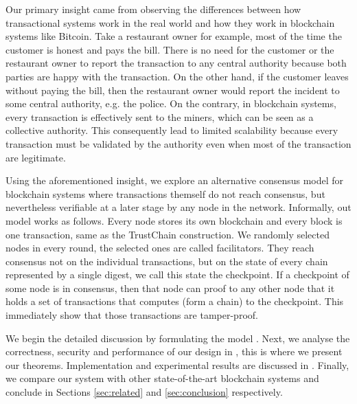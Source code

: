 Our primary insight came from observing the differences between how transactional systems work in the real world and how they work in blockchain systems like Bitcoin. 
Take a restaurant owner for example, most of the time the customer is honest and pays the bill.
There is no need for the customer or the restaurant owner to report the transaction to any central authority 
because both parties are happy with the transaction.
On the other hand, if the customer leaves without paying the bill,
then the restaurant owner would report the incident to some central authority, e.g. the police.
On the contrary, in blockchain systems, every transaction is effectively sent to the miners,
which can be seen as a collective authority.
This consequently lead to limited scalability because every transaction must be validated by the authority even when most of the transaction are legitimate.

Using the aforementioned insight,
we explore an alternative consensus model for blockchain systems where transactions themself do not reach consensus,
but nevertheless verifiable at a later stage by any node in the network.
Informally, out model works as follows.
Every node stores its own blockchain and every block is one transaction, same as the TrustChain construction.
We randomly selected nodes in every round, the selected ones are called facilitators.
They reach consensus not on the individual transactions,
but on the state of every chain represented by a single digest, we call this state the checkpoint.
If a checkpoint of some node is in consensus, 
then that node can proof to any other node that it holds a set of transactions that computes (form a chain) to the checkpoint.
This immediately show that those transactions are tamper-proof.

We begin the detailed discussion by formulating the model . 
Next, we analyse the correctness, security and performance of our design in ,
this is where we present our theorems.
Implementation and experimental results are discussed in .
Finally, we compare our system with other state-of-the-art blockchain systems and conclude in Sections \ref{sec:related} and \ref{sec:conclusion} respectively.


